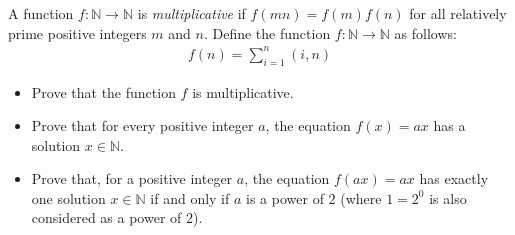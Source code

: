%
%
%
%
%

\begin{problem}
	A function $f:\mathbb{N}\to\mathbb{N}$ is \textit{multiplicative} if $f(mn)=f(m)f(n)$ for all relatively prime positive integers $m$ and $n$. Define the function $f: \mathbb{N}\to\mathbb{N}$ as follows:
		\begin{align*}
			f(n)=\sum_{i=1}^{n}(i, n)
		\end{align*}
	\begin{itemize}
		\item Prove that the function $f$ is multiplicative.
		\item Prove that for every positive integer $a$, the equation $f(x) = ax$ has a solution $x\in\mathbb{N}$.
		\item Prove that, for a positive integer $a$, the equation $f(ax) = ax$ has exactly one solution $x\in\mathbb{N}$ if and only if $a$ is a power of $2$ (where $1=2^0$ is also considered as a power of $2$).
	\end{itemize}%
\end{problem}

